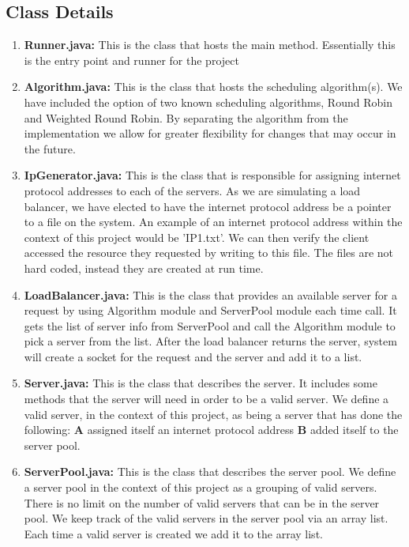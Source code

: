 \documentclass[12pt]{article}
\begin{document}
\subsection{Class Details}
\begin{enumerate}
    \item \textbf{Runner.java: }This is the class that hosts the main method. Essentially this is the entry point and runner for the project 
   \item \textbf{Algorithm.java: }This is the class that hosts the scheduling algorithm(s). We have included the option of two known scheduling algorithms, Round Robin and Weighted Round Robin. By separating the algorithm from the implementation we allow for greater flexibility for changes that may occur in the future.
   \item \textbf{IpGenerator.java: }This is the class that is responsible for assigning internet protocol addresses to each of the servers. As we are simulating a load balancer, we have elected to have the internet protocol address be a pointer to a file on the system. An example of an internet protocol address within the context of this project would be 'IP1.txt'. We can then verify the client accessed the resource they requested by writing to this file. The files are not hard coded, instead they are created at run time.
   \item \textbf{LoadBalancer.java: }This is the class that provides an available server for a request by using Algorithm module and ServerPool module each time call. It gets the list of server info from ServerPool and call the Algorithm module to pick a server from the list. After the load balancer returns the server, system will create a socket for the request and the server and add it to a list.
   \item \textbf{Server.java: }This is the class that describes the server. It includes some methods that the server will need in order to be a valid server. We define a valid server, in the context of this project, as being a server that has done the following: \textbf{A} assigned itself an internet protocol address \textbf{B} added itself to the server pool. 
   \item \textbf{ServerPool.java: }This is the class that describes the server pool. We define a server pool in the context of this project as a grouping of valid servers. There is no limit on the number of valid servers that can be in the server pool. We keep track of the valid servers in the server pool via an array list. Each time a valid server is created we add it to the array list.

\end{enumerate}
\end{document}
